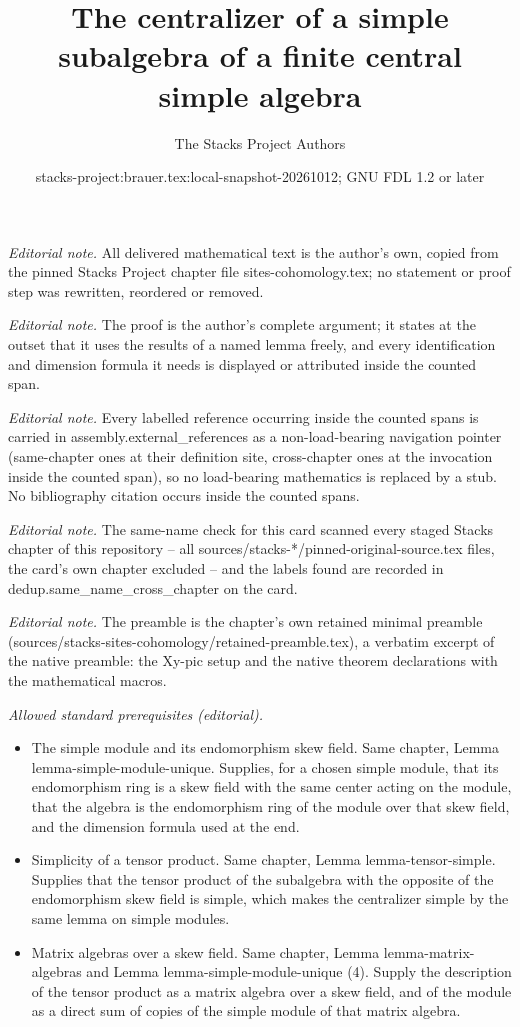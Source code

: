 \documentclass[10pt,a4paper]{amsart}
\title{The centralizer of a simple subalgebra of a finite central simple algebra}
\author{The Stacks Project Authors}
\date{stacks-project:brauer.tex:local-snapshot-20261012; GNU FDL 1.2 or later}
\theoremstyle{plain}
\theoremstyle{definition}
\theoremstyle{remark}
\numberwithin{equation}{subsection}
\begin{document}
\maketitle
\noindent\textit{Editorial note.} All delivered mathematical text is the author's own, copied from the pinned Stacks Project chapter file sites-cohomology.tex; no statement or proof step was rewritten, reordered or removed.\par\medskip
\noindent\textit{Editorial note.} The proof is the author's complete argument; it states at the outset that it uses the results of a named lemma freely, and every identification and dimension formula it needs is displayed or attributed inside the counted span.\par\medskip
\noindent\textit{Editorial note.} Every labelled reference occurring inside the counted spans is carried in assembly.external\_references as a non-load-bearing navigation pointer (same-chapter ones at their definition site, cross-chapter ones at the invocation inside the counted span), so no load-bearing mathematics is replaced by a stub. No bibliography citation occurs inside the counted spans.\par\medskip
\noindent\textit{Editorial note.} The same-name check for this card scanned every staged Stacks chapter of this repository -- all sources/stacks-*/pinned-original-source.tex files, the card's own chapter excluded -- and the labels found are recorded in dedup.same\_name\_cross\_chapter on the card.\par\medskip
\noindent\textit{Editorial note.} The preamble is the chapter's own retained minimal preamble (sources/stacks-sites-cohomology/retained-preamble.tex), a verbatim excerpt of the native preamble: the Xy-pic setup and the native theorem declarations with the mathematical macros.\par\medskip
\noindent\textit{Allowed standard prerequisites (editorial).}\begin{itemize}
\item The simple module and its endomorphism skew field. Same chapter, Lemma lemma-simple-module-unique. Supplies, for a chosen simple module, that its endomorphism ring is a skew field with the same center acting on the module, that the algebra is the endomorphism ring of the module over that skew field, and the dimension formula used at the end.
\item Simplicity of a tensor product. Same chapter, Lemma lemma-tensor-simple. Supplies that the tensor product of the subalgebra with the opposite of the endomorphism skew field is simple, which makes the centralizer simple by the same lemma on simple modules.
\item Matrix algebras over a skew field. Same chapter, Lemma lemma-matrix-algebras and Lemma lemma-simple-module-unique (4). Supply the description of the tensor product as a matrix algebra over a skew field, and of the module as a direct sum of copies of the simple module of that matrix algebra.
\end{itemize}\medskip
\end{document}
